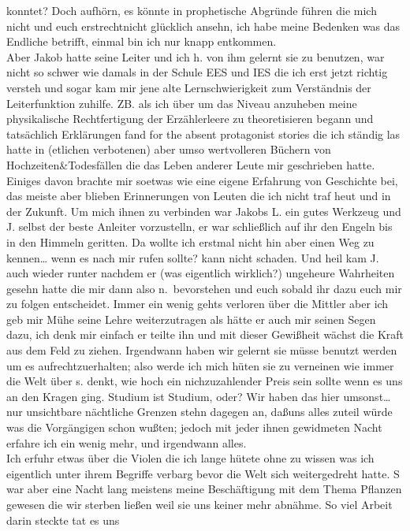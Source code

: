 \documentclass[
]{article}
\begin{document}
konntet? Doch aufhörn, es könnte in prophetische Abgründe führen die
mich nicht und euch erstrechtnicht glücklich ansehn, ich habe meine
Bedenken was das Endliche betrifft, einmal bin ich nur knapp
entkommen.\\
Aber Jakob hatte seine Leiter und ich h. von ihm gelernt sie zu
benutzen, war nicht so schwer wie damals in der Schule EES und IES die
ich erst jetzt richtig versteh und sogar kam mir jene alte
Lernschwierigkeit zum Verständnis der Leiterfunktion zuhilfe. ZB. als
ich über um das Niveau anzuheben meine physikalische Rechtfertigung der
Erzählerleere zu theoretisieren begann und tatsächlich Erklärungen fand
for the absent protagonist stories die ich ständig las hatte in
(etlichen verbotenen) aber umso wertvolleren Büchern von
Hochzeiten\&Todesfällen die das Leben anderer Leute mir geschrieben
hatte. Einiges davon brachte mir soetwas wie eine eigene Erfahrung von
Geschichte bei, das meiste aber blieben Erinnerungen von Leuten die ich
nicht traf heut und in der Zukunft. Um mich ihnen zu verbinden war
Jakobs L. ein gutes Werkzeug und J. selbst der beste Anleiter
vorzustelln, er war schließlich auf ihr den Engeln bis in den Himmeln
geritten. Da wollte ich erstmal nicht hin aber einen Weg zu
kennen\ldots{} wenn es nach mir rufen sollte? kann nicht schaden. Und
heil kam J. auch wieder runter nachdem er (was eigentlich wirklich?)
ungeheure Wahrheiten gesehn hatte die mir dann also n.~bevorstehen und
euch sobald ihr dazu euch mir zu folgen entscheidet. Immer ein wenig
gehts verloren über die Mittler aber ich geb mir Mühe seine Lehre
weiterzutragen als hätte er auch mir seinen Segen dazu, ich denk mir
einfach er teilte ihn und mit dieser Gewißheit wächst die Kraft aus dem
Feld zu ziehen. Irgendwann haben wir gelernt sie müsse benutzt werden um
es aufrechtzuerhalten; also werde ich mich hüten sie zu verneinen wie
immer die Welt über s. denkt, wie hoch ein nichzuzahlender Preis sein
sollte wenn es uns an den Kragen ging. Studium ist Studium, oder? Wir
haben das hier umsonst\ldots{} nur unsichtbare nächtliche Grenzen stehn
dagegen an, daßuns alles zuteil würde was die Vorgängigen schon wußten;
jedoch mit jeder ihnen gewidmeten Nacht erfahre ich ein wenig mehr, und
irgendwann alles.\\
Ich erfuhr etwas über die Violen die ich lange hütete ohne zu wissen was
ich eigentlich unter ihrem Begriffe verbarg bevor die Welt sich
weitergedreht hatte. S war aber eine Nacht lang meistens meine
Beschäftigung mit dem Thema Pflanzen gewesen die wir sterben ließen weil
sie uns keiner mehr abnähme. So viel Arbeit darin steckte tat es uns
\end{document}
